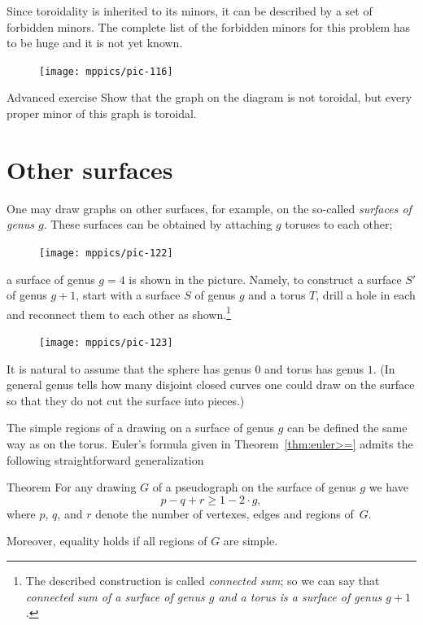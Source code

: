 Since toroidality is inherited to its minors, it can be described by a set of forbidden minors.
The complete list of the forbidden minors for this problem has to be huge and it is not yet known.

{

\begin{figure}
\vskip-7mm
\centering
\texttt{[image: mppics/pic-116]}
\vskip0mm
\end{figure}

\begin{thm}{Advanced exercise}
Show that the graph on the diagram is not toroidal,
but every proper minor of this graph is toroidal.
\end{thm}

}

\section*{Other surfaces}

One may draw graphs on other surfaces,
for example, on the so-called \emph{surfaces of genus $g$}.
These surfaces can be obtained by attaching $g$ toruses to each other; 
\begin{figure}[h!]%
\vskip-0mm
\centering
\texttt{[image: mppics/pic-122]}
\vskip-0mm
\end{figure}
a surface of genus $g=4$ is shown in the picture.
Namely, to construct a surface $S'$ of genus $g+1$, start with a surface $S$ of genus $g$ and a torus $T$, drill a hole in each and reconnect them to each other as shown.\footnote{The described construction is called \emph{connected sum}; so we can say that {}\emph{connected sum of a surface of genus $g$ and a torus is a surface of genus $g+1$}.}
\begin{figure}[h!]%
\vskip-0mm
\centering
\texttt{[image: mppics/pic-123]}
\vskip-0mm
\end{figure}


It is natural to assume that the sphere has genus $0$ and torus has genus $1$.
(In general genus tells how many disjoint closed curves one could draw on the surface so that they do not cut the surface into pieces.)

The simple regions of a drawing on a surface of genus $g$ can be defined the same way as on the torus.
Euler's formula given in Theorem~\ref{thm:euler>=} admits the following straightforward generalization

\begin{thm}{Theorem}\label{thm:euler>=genus}
For any drawing $G$ of a pseudograph on the surface of genus $g$ we have
\[p-q+r\ge 1-2\cdot g,\]
where $p$, $q$, and $r$ denote the number of vertexes, edges and regions of~$G$.

Moreover, equality holds if all regions of $G$ are simple.
\end{thm}

